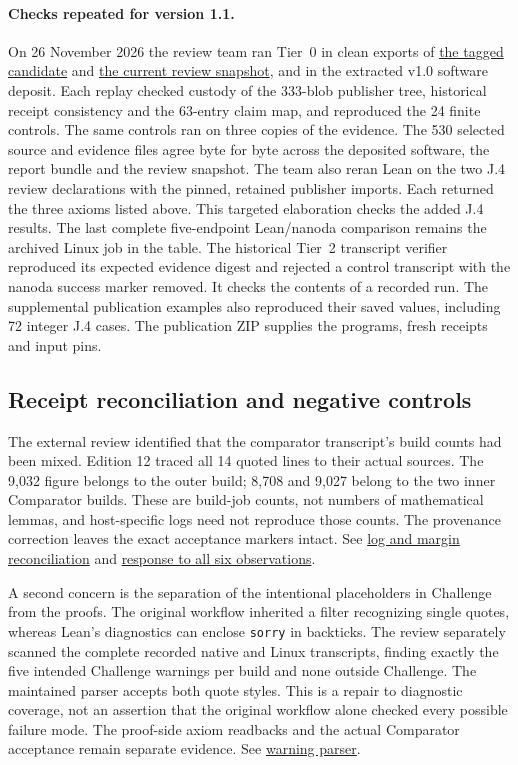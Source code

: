 \documentclass[11pt,letterpaper]{article}
\theoremstyle{definition}\newtheorem{definition}[theorem]{Definition}\newtheorem{example}[theorem]{Example}
\theoremstyle{remark}\newtheorem{remark}[theorem]{Remark}
\newcommand{\aud}[2]{\href{https://github.com/nousentllc/VP-VNP-Review/blob/567303d0bcf4f9d54390437b137752446e58ccd6/#1}{#2}}
\begin{document}
\paragraph{Checks repeated for version 1.1.}
On 26 November 2026 the review team ran Tier~0 in clean exports of
\href{https://github.com/nousentllc/VP-VNP-Review/tree/f726d3a7608e31b5c88804764b6e65c203179d42}{the tagged candidate}
and \href{https://github.com/nousentllc/VP-VNP-Review/tree/f7d16f5fd48ac0ffcfe50c3828778dc7c97a27c3}{the current review snapshot},
and in the extracted v1.0 software deposit. Each replay checked custody of the 333-blob publisher tree, historical receipt consistency and the 63-entry claim map, and reproduced the 24 finite controls. The same controls ran on three copies of the evidence. The 530 selected source and evidence files agree byte for byte across the deposited software, the report bundle and the review snapshot.
The team also reran Lean on the two J.4 review declarations with the pinned, retained publisher imports. Each returned the three axioms listed above. This targeted elaboration checks the added J.4 results. The last complete five-endpoint Lean/nanoda comparison remains the archived Linux job in the table.
The historical Tier~2 transcript verifier reproduced its expected evidence digest and rejected a control transcript with the nanoda success marker removed. It checks the contents of a recorded run. The supplemental publication examples also reproduced their saved values, including 72 integer J.4 cases. The publication ZIP supplies the programs, fresh receipts and input pins.

\subsection{Receipt reconciliation and negative controls}\label{sec:receipts}
The external review identified that the comparator transcript's build counts had been mixed. Edition 12 traced all 14 quoted lines to their actual sources. The 9,032 figure belongs to the outer build; 8,708 and 9,027 belong to the two inner Comparator builds. These are build-job counts, not numbers of mathematical lemmas, and host-specific logs need not reproduce those counts. The provenance correction leaves the exact acceptance markers intact. See \aud{reconciliation/edition12-comparator-and-margin.md}{log and margin reconciliation} and \aud{reconciliation/edition12-external-review.md}{response to all six observations}.

A second concern is the separation of the intentional placeholders in Challenge from the proofs. The original workflow inherited a filter recognizing single quotes, whereas Lean's diagnostics can enclose \texttt{sorry} in backticks. The review separately scanned the complete recorded native and Linux transcripts, finding exactly the five intended Challenge warnings per build and none outside Challenge. The maintained parser accepts both quote styles. This is a repair to diagnostic coverage, not an assertion that the original workflow alone checked every possible failure mode. The proof-side axiom readbacks and the actual Comparator acceptance remain separate evidence. See \aud{checks/pass14_warnings.py}{warning parser}.
\end{document}

